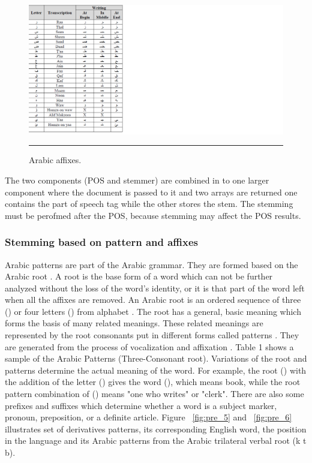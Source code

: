 \begin{figure}[htbp]
	\centering
		\includegraphics{./Figures/pre_4.png}
		\rule{35em}{0.5pt}
	\caption[Arabic affixes.]{Arabic affixes.}
	\label{fig:pre_4}
\end{figure}

The two components (POS and stemmer) are combined in to one larger component where the document is passed to it and two arrays are returned one contains the part of speech tag while the other stores the stem. The stemming must be perofmed after the POS, because stemming may affect the POS results.

\subsubsection{Stemming based on pattern and affixes}
Arabic patterns are part of the Arabic grammar. They are formed based on the Arabic root \citep{pre_4}. A
root is the base form of a word which can not be further analyzed without the loss of the word's
identity, or it is that part of the word left when all the affixes are removed.
An Arabic root is an ordered sequence of three () or four letters () from alphabet \citep{pre_5}. The
root has a general, basic meaning which forms the basis of many related meanings. These related
meanings are represented by the root consonants put in different forms called patterns \citep{pre_6}. They
are generated from the process of vocalization and affixation \citep{pre_20}. Table 1 shows a sample of the
Arabic Patterns (Three-Consonant root).
Variations of the root and patterns determine the actual meaning of the word. For example, the
root () with the addition of the letter () gives the word (), which means book, while the root pattern combination of 
() means "one who writes" or "clerk". There are
also some prefixes and suffixes which determine whether a word is a subject marker, pronoun,
preposition, or a definite article. Figure ~\ref{fig:pre_5} and ~\ref{fig:pre_6} illustrates set of derivatives patterns, its corresponding
English word, the position in the language and its Arabic patterns from the Arabic trilateral verbal
root  (k t b).


